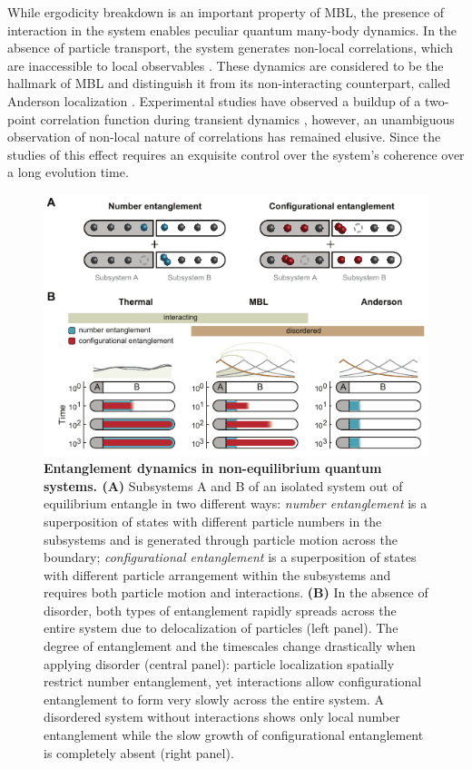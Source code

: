 While ergodicity breakdown is an important property of MBL, the presence of interaction in the system enables peculiar quantum many-body dynamics. In the absence of particle transport, the system generates non-local correlations\cite{Znidaric2008, Bardarson2012}, which are inaccessible to local observables \cite{Serbyn2013, Serbyn2013b, Huse2014}. These dynamics are considered to be the hallmark of MBL and distinguish it from its non-interacting counterpart, called Anderson localization \cite{Anderson1958, Schwartz2007, Billy2008, Roati2008, Lahini2008, Kondov2011, Jendrzejewski2012, Semeghini2015}. Experimental studies have observed a buildup of a two-point correlation function during transient dynamics \cite{Smith2015}, however, an unambiguous observation of non-local nature of correlations has remained elusive. Since the studies of this effect requires an exquisite control over the system's coherence over a long evolution time.

\begin{figure}[t]
	\centering
	\includegraphics{figures/MBL_entropies.pdf}
	\caption{{\bf Entanglement dynamics in non-equilibrium quantum systems. (A)} Subsystems A and B of an isolated system out of equilibrium entangle in two different ways: \textit{number entanglement} is a superposition of states with different particle numbers in the subsystems and is generated through particle motion across the boundary; \textit{configurational entanglement} is a superposition of states with different particle arrangement within the subsystems and requires both particle motion and interactions. \textbf{(B)} In the absence of disorder, both types of entanglement rapidly spreads across the entire system due to delocalization of particles (left panel). The degree of entanglement and the timescales change drastically when applying disorder (central panel): particle localization spatially restrict number entanglement, yet interactions allow configurational entanglement to form very slowly across the entire system. A disordered system without interactions shows only local number entanglement while the slow growth of configurational entanglement is completely absent (right panel).}
	\label{fig:MBL_schematics}
\end{figure}

